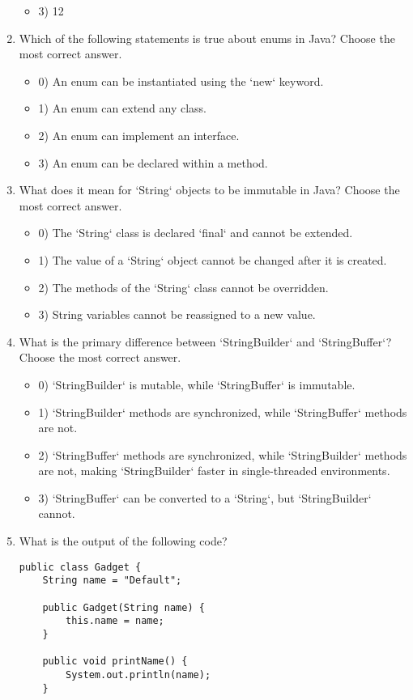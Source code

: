 \documentclass[12pt]{article}
\begin{document}
\begin{enumerate}[label=(\arabic*)]
\begin{itemize}
\item 3) 12
\end{itemize}
\item Which of the following statements is true about enums in Java?
Choose the most correct answer. 
\begin{itemize}
\item 0) An enum can be instantiated using the `new` keyword.
\item 1) An enum can extend any class.
\item 2) An enum can implement an interface.
\item 3) An enum can be declared within a method.
\end{itemize}
\item What does it mean for `String` objects to be immutable in Java?
Choose the most correct answer. 
\begin{itemize}
\item 0) The `String` class is declared `final` and cannot be extended.
\item 1) The value of a `String` object cannot be changed after it is created.
\item 2) The methods of the `String` class cannot be overridden.
\item 3) String variables cannot be reassigned to a new value.
\end{itemize}
\item What is the primary difference between `StringBuilder` and `StringBuffer`?
Choose the most correct answer. 
\begin{itemize}
\item 0) `StringBuilder` is mutable, while `StringBuffer` is immutable.
\item 1) `StringBuilder` methods are synchronized, while `StringBuffer` methods are not.
\item 2) `StringBuffer` methods are synchronized, while `StringBuilder` methods are not, making `StringBuilder` faster in single-threaded environments.
\item 3) `StringBuffer` can be converted to a `String`, but `StringBuilder` cannot.
\end{itemize}
\item What is the output of the following code?\n\begin{verbatim}
public class Gadget {
    String name = "Default";

    public Gadget(String name) {
        this.name = name;
    }

    public void printName() {
        System.out.println(name);
    }


\end{verbatim}
\end{enumerate}
\end{document}
